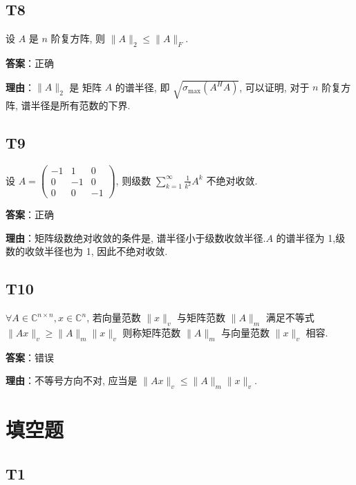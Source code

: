 \documentclass{article}
\begin{document}
\subsection{T8}

\par 设 $A$ 是 $n$ 阶复方阵, 则 $\|A\|_2\leq \|A\|_F$.

\par \textbf{答案}：正确

\par \textbf{理由}：$\|A\|_2$ 是 矩阵 $A$ 的谱半径, 即 $\sqrt{\sigma_{\text{max}}(A^HA)}$, 可以证明, 对于 $n$ 阶复方阵, 谱半径是所有范数的下界.

\subsection{T9}

\par 设 $A=\begin{pmatrix}-1 & 1 & 0\\0 & -1 & 0\\0 & 0 &-1\end{pmatrix}$, 则级数 $\sum_{k=1}^{\infty}\frac{1}{k^2}A^k$ 不绝对收敛.

\par \textbf{答案}：正确

\par \textbf{理由}：矩阵级数绝对收敛的条件是, 谱半径小于级数收敛半径.$A$ 的谱半径为 1,级数的收敛半径也为 1, 因此不绝对收敛.

\subsection{T10}

\par $\forall A\in \mathbb C^{n\times n}, x\in \mathbb C^n$, 若向量范数 $\|x\|_v$ 与矩阵范数 $\|A\|_m$ 满足不等式 $\|Ax\|_v\geq \|A\|_m \|x\|_v$ 则称矩阵范数 $\|A\|_m$ 与向量范数 $\|x\|_v$ 相容.

\par \textbf{答案}：错误

\par \textbf{理由}：不等号方向不对, 应当是 $\|Ax\|_v\leq \|A\|_m \|x\|_v$.

\section{填空题}

\subsection{T1}
\end{document}
